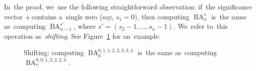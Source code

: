 \documentclass[sigconf, review, anonymous]{acmart}
\DeclareMathOperator{\BA}{BA}
\begin{document}
In~the proof, we~use the following straightforward observation:
if~the significance vector~$s$ contains a~single zero (say, $s_1=0$), then computing $\BA^s_n$ is~the same as~computing $\BA^{s'}_{n-1}$, where $s'=(s_2-1,\dotsc, s_n-1)$. We~refer to~this operation as~\emph{shifting}.
See Figure~\ref{figure:shifting} for an~example.

\begin{figure}
    \begin{center}
    \end{center}
    \caption{Shifting: computing $\BA_8^{0,1,1,2,3,3,3,4}$ is~the same as~computing $\BA_7^{0,0,1,2,2,2,3}$.}
    \label{figure:shifting}
\end{figure}
\end{document}

